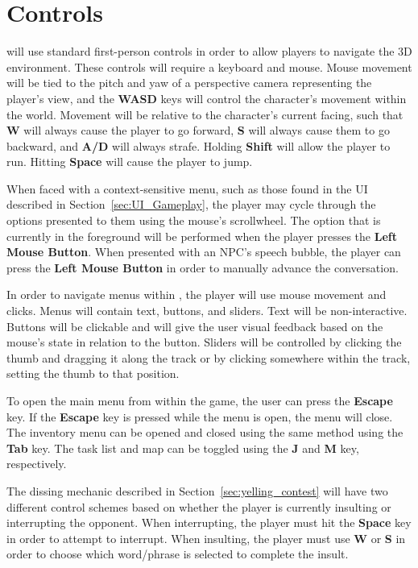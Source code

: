 \section{Controls}
\ourgame{} will use standard first-person controls in order to allow players to navigate the 3D environment. These controls will require a keyboard and mouse. Mouse movement will be tied to the pitch and yaw of a perspective camera representing the player's view, and the \textbf{WASD} keys will control the character's movement within the world. Movement will be relative to the character's current facing, such that \textbf{W} will always cause the player to go forward, \textbf{S} will always cause them to go backward, and \textbf{A/D} will always strafe. Holding \textbf{Shift} will allow the player to run. Hitting \textbf{Space} will cause the player to jump.

When faced with a context-sensitive menu, such as those found in the UI described in Section~\ref{sec:UI_Gameplay}, the player may cycle through the options presented to them using the mouse's scrollwheel. The option that is currently in the foreground will be performed when the player presses the \textbf{Left Mouse Button}. When presented with an NPC's speech bubble, the player can press the \textbf{Left Mouse Button} in order to manually advance the conversation.

In order to navigate menus within \ourgame{}, the player will use mouse movement and clicks. Menus will contain text, buttons, and sliders. Text will be non-interactive. Buttons will be clickable and will give the user visual feedback based on the mouse's state in relation to the button. Sliders will be controlled by clicking the thumb and dragging it along the track or by clicking somewhere within the track, setting the thumb to that position.

To open the main menu from within the game, the user can press the \textbf{Escape} key. If the \textbf{Escape} key is pressed while the menu is open, the menu will close. The inventory menu can be opened and closed using the same method using the \textbf{Tab} key. The task list and map can be toggled using the \textbf{J} and \textbf{M} key, respectively.

The dissing mechanic described in Section~\ref{sec:yelling_contest} will have two different control schemes based on whether the player is currently insulting or interrupting the opponent. When interrupting, the player must hit the \textbf{Space} key in order to attempt to interrupt. When insulting, the player must use \textbf{W} or \textbf{S} in order to choose which word/phrase is selected to complete the insult. 

